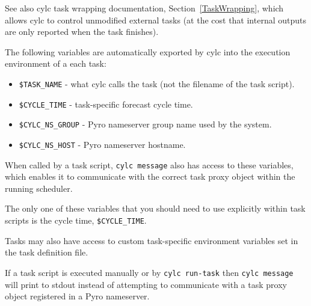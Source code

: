 
See also cylc task wrapping documentation, Section~\ref{TaskWrapping},
which allows cylc to control unmodified external tasks (at the cost that
internal outputs are only reported when the task finishes).

\lstset{language=bash}

The following variables are automatically exported by cylc into
the execution environment of a each task:
\begin{itemize}
   \item \lstinline=$TASK_NAME= - what cylc calls the task (not the
       filename of the task script). 
   \item \lstinline=$CYCLE_TIME= - task-specific forecast cycle time.
   \item \lstinline=$CYLC_NS_GROUP= - Pyro nameserver group name used by the system.
   \item \lstinline=$CYLC_NS_HOST= - Pyro nameserver hostname.
\end{itemize}

When called by a task script, \lstinline=cylc message= also has access to
these variables, which enables it to communicate with the correct task
proxy object within the running scheduler. 

The only one of these variables that you should need to use explicitly
within task scripts is the cycle time, \lstinline=$CYCLE_TIME=.

Tasks may also have access to custom task-specific environment variables
set in the task definition file.

If a task script is executed manually or by \lstinline=cylc run-task=
then \lstinline=cylc message= will print to stdout instead of attempting
to communicate with a task proxy object registered in a Pyro nameserver.
